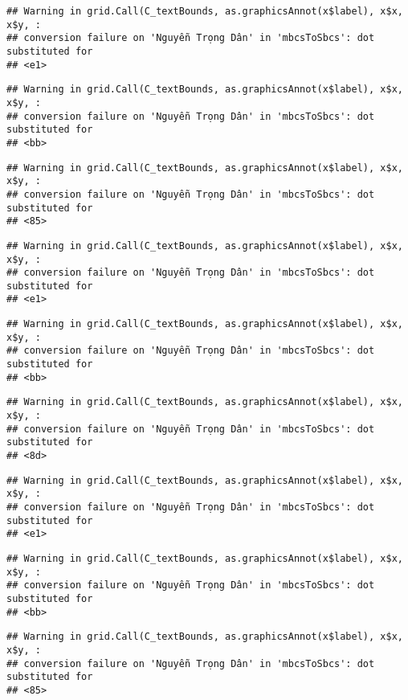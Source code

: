 \documentclass[
]{article}
\begin{document}
\begin{verbatim}
## Warning in grid.Call(C_textBounds, as.graphicsAnnot(x$label), x$x, x$y, :
## conversion failure on 'Nguyễn Trọng Dân' in 'mbcsToSbcs': dot substituted for
## <e1>
\end{verbatim}

\begin{verbatim}
## Warning in grid.Call(C_textBounds, as.graphicsAnnot(x$label), x$x, x$y, :
## conversion failure on 'Nguyễn Trọng Dân' in 'mbcsToSbcs': dot substituted for
## <bb>
\end{verbatim}

\begin{verbatim}
## Warning in grid.Call(C_textBounds, as.graphicsAnnot(x$label), x$x, x$y, :
## conversion failure on 'Nguyễn Trọng Dân' in 'mbcsToSbcs': dot substituted for
## <85>
\end{verbatim}

\begin{verbatim}
## Warning in grid.Call(C_textBounds, as.graphicsAnnot(x$label), x$x, x$y, :
## conversion failure on 'Nguyễn Trọng Dân' in 'mbcsToSbcs': dot substituted for
## <e1>
\end{verbatim}

\begin{verbatim}
## Warning in grid.Call(C_textBounds, as.graphicsAnnot(x$label), x$x, x$y, :
## conversion failure on 'Nguyễn Trọng Dân' in 'mbcsToSbcs': dot substituted for
## <bb>
\end{verbatim}

\begin{verbatim}
## Warning in grid.Call(C_textBounds, as.graphicsAnnot(x$label), x$x, x$y, :
## conversion failure on 'Nguyễn Trọng Dân' in 'mbcsToSbcs': dot substituted for
## <8d>
\end{verbatim}

\begin{verbatim}
## Warning in grid.Call(C_textBounds, as.graphicsAnnot(x$label), x$x, x$y, :
## conversion failure on 'Nguyễn Trọng Dân' in 'mbcsToSbcs': dot substituted for
## <e1>
\end{verbatim}

\begin{verbatim}
## Warning in grid.Call(C_textBounds, as.graphicsAnnot(x$label), x$x, x$y, :
## conversion failure on 'Nguyễn Trọng Dân' in 'mbcsToSbcs': dot substituted for
## <bb>
\end{verbatim}

\begin{verbatim}
## Warning in grid.Call(C_textBounds, as.graphicsAnnot(x$label), x$x, x$y, :
## conversion failure on 'Nguyễn Trọng Dân' in 'mbcsToSbcs': dot substituted for
## <85>
\end{verbatim}
\end{document}
